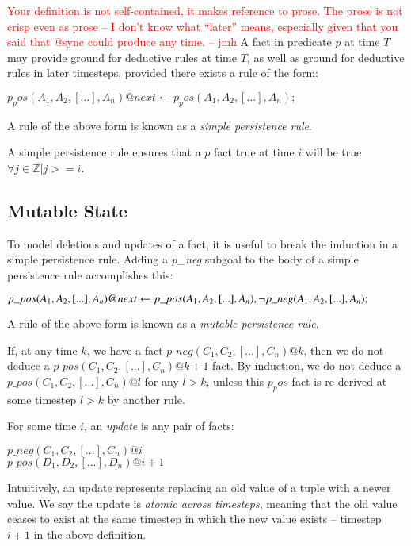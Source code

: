\documentclass{acm_proc_article-sp-sigmod09}
\newcommand{\jmh}[1]{{\textcolor{red}{#1 -- jmh}}}
\begin{document}
\jmh{Your definition is not self-contained, it makes reference to prose.  The prose is not crisp even as prose -- I don't know what ``later'' means, especially given that you said that @sync could produce any time.}
A fact in predicate $p$ at time $T$ may provide ground for deductive rules
at time $T$, as well as ground for deductive rules in later timesteps,
provided there exists a rule of the form:

$p_pos(A_1,A_2,[...],A_n)@next \leftarrow 
p_pos(A_1,A_2,[...],A_n);$

\begin{definition}
%
A rule of the above form is known as a {\em simple persistence rule}.
%
\end{definition}

A simple persistence rule ensures that a $p$ fact true at time $i$ will be true
$\forall j \in \mathbb{Z} | j >= i$.

\subsection{Mutable State}

To model deletions and updates of a fact, it is useful to break the induction
in a simple persistence rule.  Adding a {\em p\_neg} subgoal to the body of a
simple persistence rule accomplishes this:

$p\_pos(A_1,A_2,[...],A_n)@next \leftarrow \\
p\_pos(A_1,A_2,[...],A_n), \\
\lnot p\_neg(A_1,A_2,[...],A_n);
$

\begin{definition}
%
A rule of the above form is known as a {\em mutable persistence rule}.
%
\end{definition}

If, at any time $k$, we have a fact $p\_neg(C_1,C_2,[...],C_n)@k$, then we do
not deduce a $p\_pos(C_1,C_2,[...],C_n)@k+1$ fact.  By induction, we do not
deduce a $p\_pos(C_1,C_2,[...],C_n)@l$ for any $l > k$, unless this $p_pos$
fact is re-derived at some timestep $l > k$ by another rule.

\begin{definition}
%
For some time $i$, an {\em update} is any pair of facts:

$p\_neg(C_{1},C_{2},[...],C_{n})@i$ \\ $p\_pos(D_{1},D_{2},[...],D_{n})@i+1$
%
\end{definition}

Intuitively, an update represents replacing an old value of a tuple with a
newer value.  We say the update is {\em atomic across timesteps}, meaning that
the old value ceases to exist at the same timestep in which the new value
exists -- timestep $i+1$ in the above definition.
\end{document}
